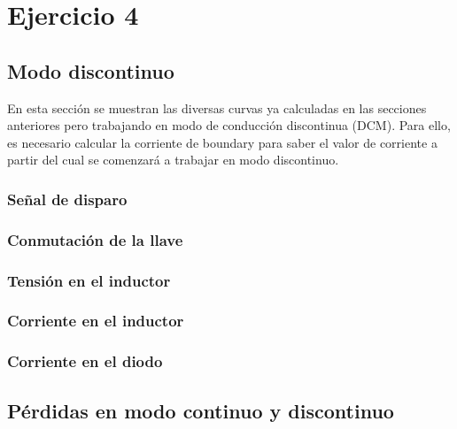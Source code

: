 \documentclass[e4_tp1_main.tex]{subfiles}
\begin{document}
\section{Ejercicio 4}

\subsection{Modo discontinuo}
En esta sección se muestran las diversas curvas ya calculadas en las secciones anteriores pero trabajando en modo de conducción discontinua (DCM). Para ello, es necesario calcular la corriente de boundary para saber el valor de corriente a partir del cual se comenzará a trabajar en modo discontinuo.

\subsubsection{Señal de disparo}

\subsubsection{Conmutación de la llave}

\subsubsection{Tensión en el inductor}

\subsubsection{Corriente en el inductor}

\subsubsection{Corriente en el diodo}


\subsection{Pérdidas en modo continuo y discontinuo}
\end{document}
